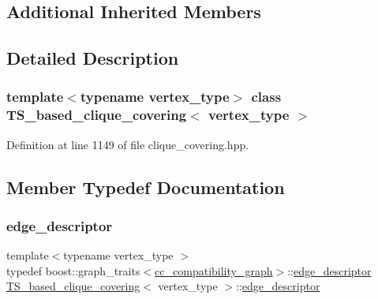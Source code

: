 \subsection*{Additional Inherited Members}


\subsection{Detailed Description}
\subsubsection*{template$<$typename vertex\+\_\+type$>$\newline
class T\+S\+\_\+based\+\_\+clique\+\_\+covering$<$ vertex\+\_\+type $>$}



Definition at line 1149 of file clique\+\_\+covering.\+hpp.



\subsection{Member Typedef Documentation}
\mbox{\label{classTS__based__clique__covering_ab89e23e8ad01980e2ea3ac0d796db907}} 
\subsubsection{\texorpdfstring{edge\+\_\+descriptor}{edge\_descriptor}}
{\footnotesize\ttfamily template$<$typename vertex\+\_\+type $>$ \\
typedef boost\+::graph\+\_\+traits$<$\hyperlink{clique__covering__graph_8hpp_aa88e9419fe776ef37020cacd507cc4ad}{cc\+\_\+compatibility\+\_\+graph}$>$\+::\hyperlink{classTS__based__clique__covering_ab89e23e8ad01980e2ea3ac0d796db907}{edge\+\_\+descriptor} \hyperlink{classTS__based__clique__covering}{T\+S\+\_\+based\+\_\+clique\+\_\+covering}$<$ vertex\+\_\+type $>$\+::\hyperlink{classTS__based__clique__covering_ab89e23e8ad01980e2ea3ac0d796db907}{edge\+\_\+descriptor}\hspace{0.3cm}{\ttfamily [private]}}



